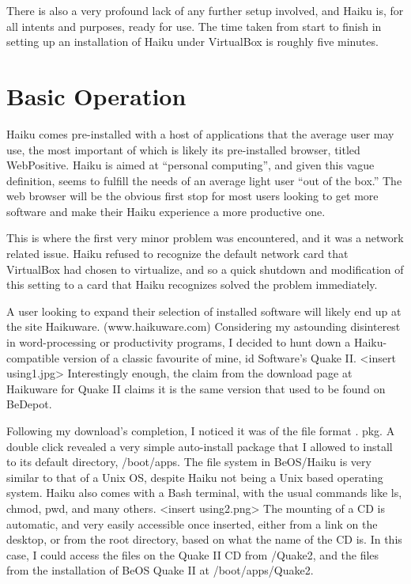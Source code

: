 \documentclass{article}
\begin{document}
There is also a very profound lack of any further setup involved, and Haiku is, 
for all intents and purposes, ready for use. The time taken from start to finish 
in setting up an installation of Haiku under VirtualBox is roughly five minutes.

\section{Basic Operation}

Haiku comes pre-installed with a host of applications that the average user may 
use, the most important of which is likely its pre-installed browser, titled 
WebPositive. Haiku is aimed at “personal computing”, and given this vague 
definition, seems to fulfill the needs of an average light user “out of the 
box.” The web browser will be the obvious first stop for most users looking 
to get more software and make their Haiku experience a more productive one.
	
This is where the first very minor problem was encountered, and it 
was a network related issue. Haiku refused to recognize the default network 
card that VirtualBox had chosen to virtualize, and so a quick shutdown and 
modification of this setting to a card that Haiku recognizes solved the problem 
immediately.
	
A user looking to expand their selection of installed software will 
likely end up at the site Haikuware. (www.haikuware.com) Considering my astounding 
disinterest in word-processing or productivity programs, I decided to hunt 
down a Haiku-compatible version of a classic favourite of mine, id Software’s 
Quake II. <insert using1.jpg> Interestingly enough, the claim from the 
download page at Haikuware for Quake II claims it is the same version that 
used to be found on BeDepot.
	
Following my download's completion, I noticed it was of the file format .
pkg. A double click revealed a very simple auto-install package that I allowed 
to install to its default directory, /boot/apps. The file system in BeOS/Haiku 
is very similar to that of a Unix OS, despite Haiku not being a Unix based 
operating system. Haiku also comes with a Bash terminal, with the usual commands 
like ls, chmod, pwd, and many others. <insert using2.png> The mounting of a 
CD is automatic, and very easily accessible once inserted, either from a link 
on the desktop, or from the root directory, based on what the name of the CD 
is. In this case, I could access the files on the Quake II CD from /Quake2, 
and the files from the installation of BeOS Quake II at /boot/apps/Quake2.
	
\end{document}

